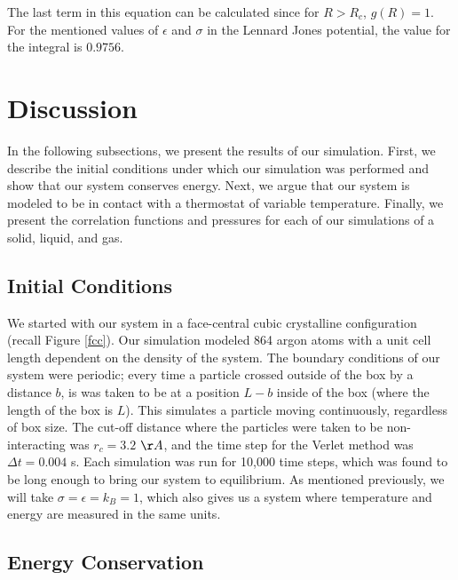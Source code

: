 \documentclass{article}
\begin{document}
\begin{multicols}{2}
\noindent The last term in this equation can be calculated since for $R>R_c$, $g(R) = 1$. For the mentioned values of $\epsilon$ and $\sigma$ in the Lennard Jones potential, the value for the integral is $0.9756$.

\section{Discussion}
\label{disc}

In the following subsections, we present the results of our simulation.  First, we describe the initial conditions under which our simulation was performed and show that our system conserves energy.  Next, we argue that our system is modeled to be in contact with a thermostat of variable temperature.  Finally, we present the correlation functions and pressures for each of our simulations of a solid, liquid, and gas.

\subsection{Initial Conditions}

We started with our system in a face-central cubic crystalline configuration (recall Figure \ref{fcc}).  Our simulation modeled  864 argon atoms with a unit cell length dependent on the density of the system.  The boundary conditions of our system were periodic; every time a particle crossed outside of the box by a distance $b$, is was taken to be at a position $L-b$ inside of the box (where the length of the box is $L$).  This simulates a particle moving continuously, regardless of box size.  The cut-off distance where the particles were taken to be non-interacting was $r_c = 3.2$ $\AA$, and the time step for the Verlet method was $\Delta t = 0.004$ s.  Each simulation was run for 10,000 time steps, which was found to be long enough to bring our system to equilibrium.  As mentioned previously, we will take $\sigma=\epsilon=k_B=1$, which also gives us a system where temperature and energy are measured in the same units.  

\subsection{Energy Conservation}


\end{multicols}
\end{document}
